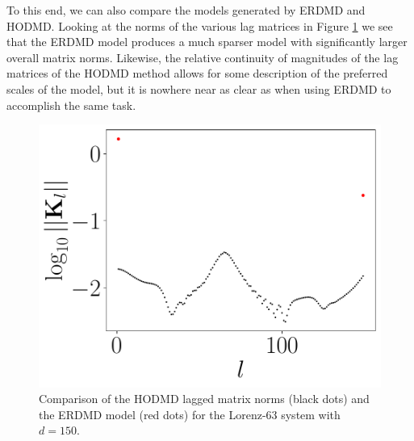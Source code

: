 \documentclass[a4paper,11pt]{article}
\begin{document}
To this end, we can also compare the models generated by ERDMD and HODMD.  Looking at the norms of the various lag matrices in Figure \ref{fig:model_comp_d_150} we see that the ERDMD model produces a much sparser model with significantly larger overall matrix norms.  Likewise, the relative continuity of magnitudes of the lag matrices of the HODMD method allows for some description of the preferred scales of the model, but it is nowhere near as clear as when using ERDMD to accomplish the same task.  
\begin{figure}[!h]
\centering
\includegraphics[width=.7\textwidth]{Lorenz_norm_full_model_149}
\caption{Comparison of the HODMD lagged matrix norms (black dots) and the ERDMD model (red dots) for the Lorenz-63 system with $d=150$.}
\label{fig:model_comp_d_150}
\end{figure}
\end{document}

